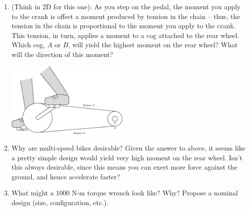 \documentclass{tufte-handout}
\begin{document}
\begin{enumerate}
\begin{enumerate}[resume]
\item (Think in 2D for this one): As you step on the pedal, the moment you apply to the crank is offset a moment produced by tension in the chain -- thus, the tension in the chain is proportional to the moment you apply to the crank.  This tension, in turn, applies a moment to a cog attached to the rear wheel.  Which cog, $A$ or $B$, will yield the highest moment on the rear wheel?  What will the direction of this moment? 
\begin{marginfigure}
\includegraphics[width=6cm]{figs/BikePedal2}
\end{marginfigure}

\item Why are multi-speed bikes desirable?  Given the answer to above, it seems like a pretty simple design would yield very high moment on the rear wheel.  Isn't this always desirable, since this means you can exert more force against the ground, and hence accelerate faster?

%

 

\item What might a 1000 N-m torque wrench look like?   Why?  Propose a nominal design (size, configuration, etc.).

%
 



\end{enumerate}
\end{enumerate}
\end{document}

